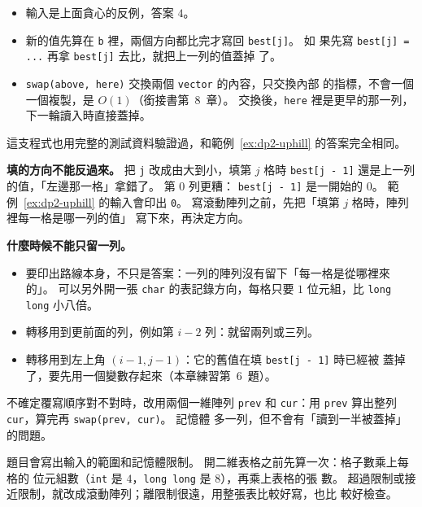 
\begin{itemize}
\item 輸入是上面貪心的反例，答案 $4$。
\item 新的值先算在 \texttt{b} 裡，兩個方向都比完才寫回 \texttt{best[j]}。 如
果先寫 \texttt{best[j] = ...} 再拿 \texttt{best[j]} 去比，就把上一列的值蓋掉
了。
\item \texttt{swap(above, here)} 交換兩個 \texttt{vector} 的內容，只交換內部
的指標，不會一個一個複製，是 $O(1)$（銜接書第~8~章）。 交換後，\texttt{here}
裡是更早的那一列，下一輪讀入時直接蓋掉。
\end{itemize}

這支程式也用完整的測試資料驗證過，和範例~\ref{ex:dp2-uphill} 的答案完全相同。

\textbf{填的方向不能反過來。} 把 \texttt{j} 改成由大到小，填第 $j$ 格時
\texttt{best[j - 1]} 還是上一列的值，「左邊那一格」拿錯了。 第 $0$ 列更糟：
\texttt{best[j - 1]} 是一開始的 $0$。 範例~\ref{ex:dp2-uphill} 的輸入會印出
\texttt{0}。 寫滾動陣列之前，先把「填第 $j$ 格時，陣列裡每一格是哪一列的值」
寫下來，再決定方向。

\textbf{什麼時候不能只留一列。}

\begin{itemize}
\item 要印出路線本身，不只是答案：一列的陣列沒有留下「每一格是從哪裡來的」。
可以另外開一張 \texttt{char} 的表記錄方向，每格只要 $1$ 位元組，比
\texttt{long long} 小八倍。
\item 轉移用到更前面的列，例如第 $i - 2$ 列：就留兩列或三列。
\item 轉移用到左上角 $(i - 1, j - 1)$：它的舊值在填 \texttt{best[j - 1]} 時已經被
蓋掉了，要先用一個變數存起來（本章練習第~6~題）。
\end{itemize}

不確定覆寫順序對不對時，改用兩個一維陣列 \texttt{prev} 和 \texttt{cur}：用
\texttt{prev} 算出整列 \texttt{cur}，算完再 \texttt{swap(prev, cur)}。 記憶體
多一列，但不會有「讀到一半被蓋掉」的問題。

\begin{apcsnote}
題目會寫出輸入的範圍和記憶體限制。 開二維表格之前先算一次：格子數乘上每格的
位元組數（\texttt{int} 是 $4$，\texttt{long long} 是 $8$），再乘上表格的張
數。 超過限制或接近限制，就改成滾動陣列；離限制很遠，用整張表比較好寫，也比
較好檢查。
\end{apcsnote}

